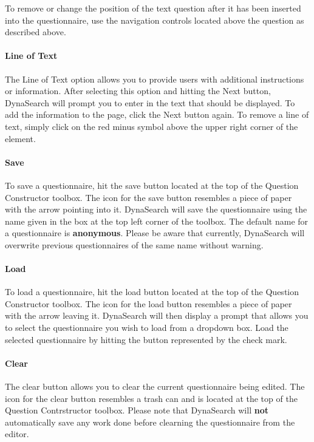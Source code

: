 \documentclass[article]{ij4uq}              %
\begin{document}
To remove or change the position of the text question after it has been inserted into the questionnaire, use the navigation controls located above the question as described above. 

\paragraph{Line of Text}
The Line of Text option allows you to provide users with additional instructions or information. After selecting this option and hitting the Next button, DynaSearch will prompt you to enter in the text that should be displayed. To add the information to the page, click the Next button again. To remove a line of text, simply click on the red minus symbol above the upper right corner of the element.

\paragraph{Save}
To save a questionnaire, hit the save button located at the top of the Question Constructor toolbox.  The icon for the save button resembles a piece of paper with the arrow pointing into it.  DynaSearch will save the questionnaire using the name given in the box at the top left corner of the toolbox.  The default name for a questionnaire is \textbf{anonymous}.  Please be aware that currently, DynaSearch will overwrite previous questionnaires of the same name without warning.

\paragraph{Load}
To load a questionnaire, hit the load button located at the top of the Question Constructor toolbox. The icon for the load button resembles a piece of paper with the arrow leaving it.  DynaSearch will then display a prompt that allows you to select the questionnaire you wish to load from a dropdown box.  Load the selected questionnaire by hitting the button represented by the check mark.

\paragraph{Clear}
The clear button allows you to clear the current questionnaire being edited.  The icon for the clear button resembles a trash can and is located at the top of the Question Contrstructor toolbox.  Please note that DynaSearch will \textbf{not} automatically save any work done before clearning the questionnaire from the editor.
\end{document}
